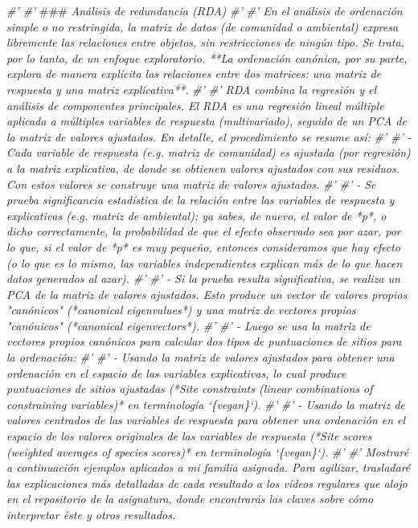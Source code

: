 \documentclass[11pt,]{article}
\newenvironment{Shaded}{\begin{snugshade}}{\end{snugshade}}
\newcommand{\CommentTok}[1]{\textcolor[rgb]{0.56,0.35,0.01}{\textit{#1}}}
\newcommand{\AlertTok}[1]{\textcolor[rgb]{0.94,0.16,0.16}{#1}}
\begin{document}
\begin{Shaded}
\begin{Highlighting}[]
{\CommentTok{#' }
\CommentTok{#' }\AlertTok{###}\CommentTok{ Análisis de redundancia (RDA)}
\CommentTok{#' }
\CommentTok{#' En el análisis de ordenación simple o no restringida, la matriz de datos (de comunidad o ambiental) expresa libremente las relaciones entre objetos, sin restricciones de ningún tipo. Se trata, por lo tanto, de un enfoque exploratorio. **La ordenación canónica, por su parte, explora de manera explícita las relaciones entre dos matrices: una matriz de respuesta y una matriz explicativa**.}
\CommentTok{#' }
\CommentTok{#' RDA combina la regresión y el análisis de componentes principales. El RDA es una regresión lineal múltiple aplicada a múltiples variables de respuesta (multivariado), seguido de un PCA de la matriz de valores ajustados. En detalle, el procedimiento se resume así:}
\CommentTok{#' }
\CommentTok{#' - Cada variable de respuesta (e.g. matriz de comunidad) es ajustada (por regresión) a la matriz explicativa, de donde se obtienen valores ajustados con sus residuos. Con estos valores se construye una matriz de valores ajustados.}
\CommentTok{#' }
\CommentTok{#' - Se prueba significancia estadística de la relación entre las variables de respuesta y explicativas (e.g. matriz de ambiental); ya sabes, de nuevo, el valor de *p*, o dicho correctamente, la probabilidad de que el efecto observado sea por azar, por lo que, si el valor de *p* es muy pequeño, entonces consideramos que hay efecto (o lo que es lo mismo, las variables independientes explican más de lo que hacen datos generados al azar).}
\CommentTok{#' }
\CommentTok{#' - Si la prueba resulta significativa, se realiza un PCA de la matriz de valores ajustados. Esto produce un vector de valores propios "canónicos" (*canonical eigenvalues*) y una matriz de vectores propios "canónicos" (*canonical eigenvectors*).}
\CommentTok{#' }
\CommentTok{#' - Luego se usa la matriz de vectores propios canónicos para calcular dos tipos de puntuaciones de sitios para la ordenación:}
\CommentTok{#' }
\CommentTok{#'     - Usando la matriz de valores ajustados para obtener una ordenación en el espacio de las variables explicativas, lo cual produce puntuaciones de sitios ajustadas (*Site constraints (linear combinations of constraining variables)* en terminología `\{vegan\}`).}
\CommentTok{#'     }
\CommentTok{#'     - Usando la matriz de valores centrados de las variables de respuesta para obtener una ordenación en el espacio de los valores originales de las variables de respuesta (*Site scores (weighted averages of species scores)* en terminología `\{vegan\}`).}
\CommentTok{#' }
\CommentTok{#' Mostraré a continuación ejemplos aplicados a mi familia asignada. Para agilizar, trasladaré las explicaciones más detalladas de cada resultado a los vídeos regulares que alojo en el repositorio de la asignatura, donde encontrarás las claves sobre cómo interpretar éste y otros resultados.}
}
\end{Highlighting}
\end{Shaded}
\end{document}
